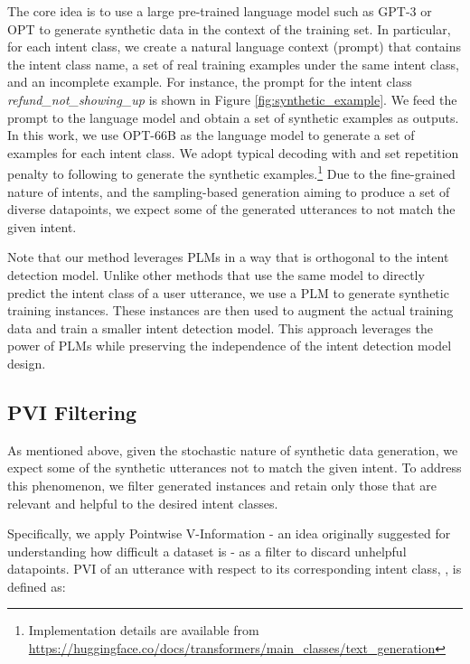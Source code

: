 \documentclass[11pt]{article}
\begin{document}
The core idea is to use a large pre-trained language model such as GPT-3 \cite{DBLP:conf/nips/BrownMRSKDNSSAA20} or OPT \cite{DBLP:journals/corr/abs-2205-01068} to generate synthetic data in the context of the training set.
In particular, for each intent class, we create a natural language context (prompt) that contains the intent class name, a set of real training examples under the same intent class, and an incomplete example.
For instance, the prompt for the intent class \textit{refund\_not\_showing\_up} is shown in Figure \ref{fig:synthetic_example}.
We feed the prompt to the language model and obtain a set of synthetic examples as outputs.
In this work, we use OPT-66B \cite{DBLP:journals/corr/abs-2205-01068}  as the language model to generate a set of examples for each intent class.
We adopt typical decoding
with  \cite{DBLP:journals/corr/abs-2202-00666} and set repetition penalty to  following \citet{DBLP:journals/corr/abs-1909-05858} to generate the synthetic examples.\footnote{Implementation details are available from \url{https://huggingface.co/docs/transformers/main_classes/text_generation}}
Due to the fine-grained nature of  intents, and the sampling-based generation aiming to produce a set of diverse datapoints, we expect some of the generated utterances to not match the given intent.

Note that our method leverages PLMs in a way that is  orthogonal to the intent detection model.
Unlike other methods that use the same model to directly predict the intent class of a user utterance, we use a PLM to generate synthetic training instances. These instances are then used to augment the actual training data and train a smaller intent detection model.
This approach leverages the power of PLMs while preserving the independence of the intent detection model design.

\subsection{PVI Filtering}
\label{sec:filtering}
As mentioned above, given the stochastic nature of synthetic data generation, we expect some of the synthetic utterances not to match the given intent. To address this phenomenon, we filter generated instances and retain only those that are relevant and helpful to the desired intent classes.

Specifically, we apply Pointwise V-Information \cite{DBLP:conf/icml/EthayarajhCS22} - an idea originally suggested for understanding how difficult a dataset is - as a filter to discard unhelpful datapoints.
PVI of an utterance  with respect to its corresponding intent class, , is defined as:
\end{document}
